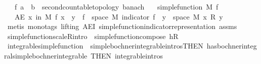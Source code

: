 \begin{isabellebody}
\ \ \ f\ {\isacharcolon}{\kern0pt}{\isacharcolon}{\kern0pt}{\isachardoublequoteopen}{\isacharprime}{\kern0pt}a\ {\isasymRightarrow}\ {\isacharprime}{\kern0pt}b\ {\isacharcolon}{\kern0pt}{\isacharcolon}{\kern0pt}\ {\isacharbraceleft}{\kern0pt}second{\isacharunderscore}{\kern0pt}countable{\isacharunderscore}{\kern0pt}topology{\isacharcomma}{\kern0pt}\ banach{\isacharbraceright}{\kern0pt}{\isachardoublequoteclose}\isanewline
\ \ \ {\isachardoublequoteopen}simple{\isacharunderscore}{\kern0pt}function\ M\ f{\isachardoublequoteclose}\isanewline
\ \ \ {\isachardoublequoteopen}AE\ x\ in\ M{\isachardot}{\kern0pt}\ f\ x\ {\isacharequal}{\kern0pt}\ {\isacharparenleft}{\kern0pt}{\isasymSum}y\ {\isasymin}\ f\ {\isacharbackquote}{\kern0pt}\ space\ M{\isachardot}{\kern0pt}\ indicator\ {\isacharparenleft}{\kern0pt}f\ {\isacharminus}{\kern0pt}{\isacharbackquote}{\kern0pt}\ {\isacharbraceleft}{\kern0pt}y{\isacharbraceright}{\kern0pt}\ {\isasyminter}\ space\ M{\isacharparenright}{\kern0pt}\ x\ {\isacharasterisk}{\kern0pt}\isactrlsub R\ y{\isacharparenright}{\kern0pt}{\isachardoublequoteclose}\ \ \isanewline
%
\isadelimproof
\ \ %
\endisadelimproof
%
\isatagproof
{}\isamarkupfalse%
\ {\isacharparenleft}{\kern0pt}metis\ {\isacharparenleft}{\kern0pt}mono{\isacharunderscore}{\kern0pt}tags{\isacharcomma}{\kern0pt}\ lifting{\isacharparenright}{\kern0pt}\ AE{\isacharunderscore}{\kern0pt}I{}\ simple{\isacharunderscore}{\kern0pt}function{\isacharunderscore}{\kern0pt}indicator{\isacharunderscore}{\kern0pt}representation\ assms{\isacharparenright}{\kern0pt}%
\endisatagproof
{\isafoldproof}%
%
\isadelimproof
\isanewline
%
\endisadelimproof
\isanewline
{}\isamarkupfalse%
\ simple{\isacharunderscore}{\kern0pt}function{\isacharunderscore}{\kern0pt}scaleR{\isacharbrackleft}{\kern0pt}intro{\isacharbrackright}{\kern0pt}\ {\isacharequal}{\kern0pt}\ simple{\isacharunderscore}{\kern0pt}function{\isacharunderscore}{\kern0pt}compose{}{\isacharbrackleft}{\kern0pt}\ h{\isacharequal}{\kern0pt}{\isachardoublequoteopen}{\isacharparenleft}{\kern0pt}{\isacharasterisk}{\kern0pt}\isactrlsub R{\isacharparenright}{\kern0pt}{\isachardoublequoteclose}{\isacharbrackright}{\kern0pt}\isanewline
{}\isamarkupfalse%
\ integrable{\isacharunderscore}{\kern0pt}simple{\isacharunderscore}{\kern0pt}function\ {\isacharequal}{\kern0pt}\ simple{\isacharunderscore}{\kern0pt}bochner{\isacharunderscore}{\kern0pt}integrable{\isachardot}{\kern0pt}intros{\isacharbrackleft}{\kern0pt}THEN\ has{\isacharunderscore}{\kern0pt}bochner{\isacharunderscore}{\kern0pt}integral{\isacharunderscore}{\kern0pt}simple{\isacharunderscore}{\kern0pt}bochner{\isacharunderscore}{\kern0pt}integrable{\isacharcomma}{\kern0pt}\ THEN\ integrable{\isachardot}{\kern0pt}intros{\isacharbrackright}{\kern0pt}%

\end{isabellebody}
